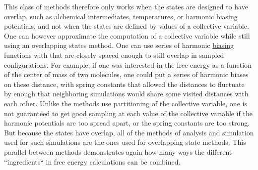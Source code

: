\documentclass[9pt,review]{livecoms}
\begin{document}
This class of methods therefore only works when the states are designed to have overlap, such as \hyperlink{ref:Alchemical} {alchemical} intermediates, temperatures, or harmonic \hyperlink{ref:biasingE} {biasing} potentials, and not when the states are defined by values of a collective variable. One can however approximate the computation of a collective variable while still using an overlapping states method.  One can use series of harmonic \hyperlink{ref:biasingE} {biasing} functions with that are closely spaced enough to still overlap in sampled configurations. For example, if one was interested in the free energy as a function of the center of mass of two molecules, one could put a series of harmonic biases on these distance, with spring constants that allowed the distances to fluctuate by enough that neighboring simulations would share some visited distances with each other. Unlike the methods use partitioning of the collective variable, one is not guaranteed to get good sampling at each value of the collective variable if the harmonic potentials are too spread apart, or the spring constants are too strong. But because the states have overlap, all of the methods of analysis and simulation used for such simulations are the ones used for overlapping state methods.  This parallel between methods demonstrates again how many ways the different ``ingredients`` in free energy calculations can be combined.   
\end{document}
